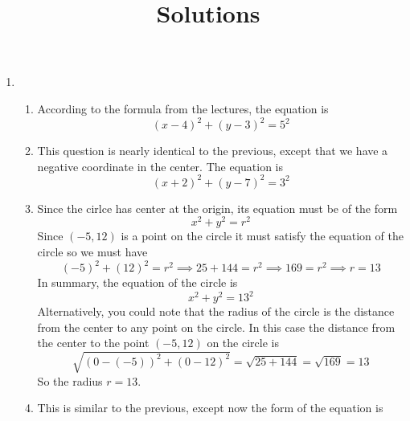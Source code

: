 \documentclass{article}
\title{\commonPSTitleZeroZeroC\ Solutions}
\author{\commonAuthor}
\date{\commonDateZeroZeroC}
\begin{document}
\maketitle
\begin{enumerate}
\item %
  \begin{enumerate}
  \item %
    According to the formula from the lectures, the equation is
    \begin{equation*}
      (x-4)^2 + (y-3)^2 = 5^2
    \end{equation*}
  \item %
    This question is nearly identical to the previous, except that we
    have a negative coordinate in the center.  The equation is
    \begin{equation*}
      (x+2)^2 + (y-7)^2 = 3^2
    \end{equation*}
  \item %
    Since the cirlce has center at the origin, its equation must be of
    the form
    \begin{equation*}
      x^2 + y^2 = r^2 
    \end{equation*}
    Since $(-5,12)$ is a point on the circle it must satisfy the
    equation of the circle so we must have
    \begin{equation*}
      (-5)^2 + (12)^2 = r^2 \implies 25 + 144 = r^2 \implies 169 = r^2
      \implies r = 13
    \end{equation*}
    In summary, the equation of the circle is
    \begin{equation*}
      x^2 + y^2 = 13^2
    \end{equation*}
    Alternatively, you could note that the radius of the circle is the
    distance from the center to any point on the circle.  In this case
    the distance from the center to the point $(-5,12)$ on the circle
    is 
    \begin{equation*}
      \sqrt{(0-(-5))^2 + (0-12)^2} = \sqrt{25+144} = \sqrt{169} = 13
    \end{equation*}
    So the radius $r=13$.
  \item %
    This is similar to the previous, except now the form of the equation is
    \begin{equation*}

\end{equation*}
\end{enumerate}
\end{enumerate}
\end{document}
